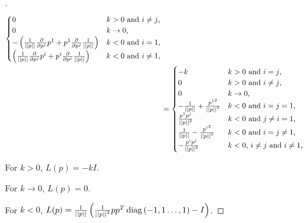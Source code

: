 \documentclass[stu, babel, american, biblatex, a4paper, leqno, draftall]{apa7}
\begin{document}
\begin{proof}[]
\begin{align*}
\begin{cases}
              0 & \text{$k>0$ and $i\ne j$,} \\
              0 & \text{$k\to 0$,} \\
              - \left({\frac{1}{\norm{p}}}\frac{\partial}{\partial\tensor{p}{^j}}\tensor{p}{^1} + \tensor{p}{^1}\frac{\partial}{\partial\tensor{p}{^j}}{\frac{1}{\norm{p}}}\right) & \text{$k<0$ and $i=1$,} \\
              \left({\frac{1}{\norm{p}}}\frac{\partial}{\partial\tensor{p}{^j}}\tensor{p}{^i} + \tensor{p}{^i}\frac{\partial}{\partial\tensor{p}{^j}}{\frac{1}{\norm{p}}}\right) & \text{$k<0$ and $i\ne 1$,} \\
            \end{cases} \\
            &= \begin{cases}
                - k & \text{$k>0$ and $i=j$,} \\
                0 & \text{$k>0$ and $i\ne j$,} \\
                0 & \text{$k\to 0$,} \\
                -{\frac{1}{\norm{p}}} + \frac{{\tensor{p}{^1}}^2}{\norm{p}^3} & \text{$k<0$ and $i=j=1$,} \\
                \frac{\tensor{p}{^1}\tensor{p}{^j}}{\norm{p}^3} & \text{$k<0$ and $j\ne i=1$,} \\
                {\frac{1}{\norm{p}}} - \frac{{\tensor{p}{^i}}^2}{\norm{p}^3} & \text{$k<0$ and $i=j\ne1$,} \\
                -\frac{\tensor{p}{^i}\tensor{p}{^j}}{\norm{p}^3} & \text{$k<0$, $i\ne j$ and $i\ne1$,} \\
              \end{cases}
    \end{align*}

    For $k>0$, $L(p)=-k I$.

    For $k\to0$, $L(p)=0$.

    For $k<0$, $L(p)= \frac{1}{\left|\left|{p}\right|\right|} \left(\frac{1}{\left|\left|{p}\right|\right|^2} p p^T \operatorname{diag}{\left(-1,1\dots,1\right)} - I\right)$.
\end{proof}
\begin{lemma}\label{Model:PrincipalCurvature}

\end{lemma}
\end{document}

